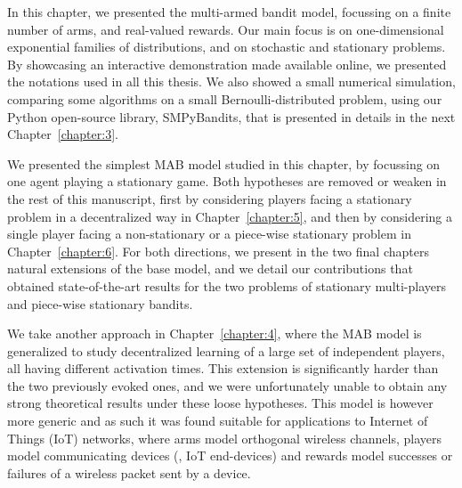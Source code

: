 In this chapter, we presented the multi-armed bandit model, focussing on a finite number of arms, and real-valued rewards.
Our main focus is on one-dimensional exponential families of distributions, and on stochastic and stationary problems.
By showcasing an interactive demonstration made available online,
we presented the notations used in all this thesis.
%
We also showed a small numerical simulation, comparing some algorithms on a small Bernoulli-distributed problem, using our Python open-source library, SMPyBandits, that is presented in details in the next Chapter~\ref{chapter:3}.

We presented the simplest MAB model studied in this chapter, by focussing on one agent playing a stationary game.
Both hypotheses are removed or weaken in the rest of this manuscript,
first by considering players facing a stationary problem in a decentralized way in Chapter~\ref{chapter:5},
and then by considering a single player facing a non-stationary or a piece-wise stationary problem in Chapter~\ref{chapter:6}.
%
For both directions, we present in the two final chapters natural extensions of the base model, and we detail our contributions that obtained state-of-the-art results for the two problems
of stationary multi-players and piece-wise stationary bandits.

We take another approach in Chapter~\ref{chapter:4}, where the MAB model is generalized to study decentralized learning of a large set of independent players, all having different activation times.
This extension is significantly harder than the two previously evoked ones, and we were unfortunately unable to obtain any strong theoretical results under these loose hypotheses.
This model is however more generic and as such it was found suitable for applications to Internet of Things (IoT) networks, where arms model orthogonal wireless channels, players model communicating devices (\ie, IoT end-devices) and rewards model successes or failures of a wireless packet sent by a device.


